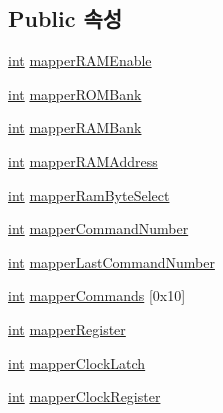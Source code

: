 \subsection*{Public 속성}
\begin{DoxyCompactItemize}
\item 
\mbox{\hyperlink{_util_8cpp_a0ef32aa8672df19503a49fab2d0c8071}{int}} \mbox{\hyperlink{structmapper_t_a_m_a5_aac7b2e1f7346e4db54bdb3158b1faf96}{mapper\+R\+A\+M\+Enable}}
\item 
\mbox{\hyperlink{_util_8cpp_a0ef32aa8672df19503a49fab2d0c8071}{int}} \mbox{\hyperlink{structmapper_t_a_m_a5_a29746447b0317e41dc6b23031c02ae97}{mapper\+R\+O\+M\+Bank}}
\item 
\mbox{\hyperlink{_util_8cpp_a0ef32aa8672df19503a49fab2d0c8071}{int}} \mbox{\hyperlink{structmapper_t_a_m_a5_a13e94f27b6428ce1c120ca95eff610ab}{mapper\+R\+A\+M\+Bank}}
\item 
\mbox{\hyperlink{_util_8cpp_a0ef32aa8672df19503a49fab2d0c8071}{int}} \mbox{\hyperlink{structmapper_t_a_m_a5_a35ce9e6605c0506391bd92b2a8b0bb9c}{mapper\+R\+A\+M\+Address}}
\item 
\mbox{\hyperlink{_util_8cpp_a0ef32aa8672df19503a49fab2d0c8071}{int}} \mbox{\hyperlink{structmapper_t_a_m_a5_afbb084b777ea7e13fe5ee89daef3682e}{mapper\+Ram\+Byte\+Select}}
\item 
\mbox{\hyperlink{_util_8cpp_a0ef32aa8672df19503a49fab2d0c8071}{int}} \mbox{\hyperlink{structmapper_t_a_m_a5_a7509dcd66b893b18dc697bb083d6d6c5}{mapper\+Command\+Number}}
\item 
\mbox{\hyperlink{_util_8cpp_a0ef32aa8672df19503a49fab2d0c8071}{int}} \mbox{\hyperlink{structmapper_t_a_m_a5_a7d91d982ac641c24b7a06122f551e8c4}{mapper\+Last\+Command\+Number}}
\item 
\mbox{\hyperlink{_util_8cpp_a0ef32aa8672df19503a49fab2d0c8071}{int}} \mbox{\hyperlink{structmapper_t_a_m_a5_acaae7b31142e0906a0a19477007d755c}{mapper\+Commands}} \mbox{[}0x10\mbox{]}
\item 
\mbox{\hyperlink{_util_8cpp_a0ef32aa8672df19503a49fab2d0c8071}{int}} \mbox{\hyperlink{structmapper_t_a_m_a5_a61d49b486114e79a62394c5b3100dcd1}{mapper\+Register}}
\item 
\mbox{\hyperlink{_util_8cpp_a0ef32aa8672df19503a49fab2d0c8071}{int}} \mbox{\hyperlink{structmapper_t_a_m_a5_aa4963da5b52b15caa2f2856b68b7c9f3}{mapper\+Clock\+Latch}}
\item 
\mbox{\hyperlink{_util_8cpp_a0ef32aa8672df19503a49fab2d0c8071}{int}} \mbox{\hyperlink{structmapper_t_a_m_a5_ae91a4bd3916079418b100eecb05e59d3}{mapper\+Clock\+Register}}

\end{DoxyCompactItemize}
